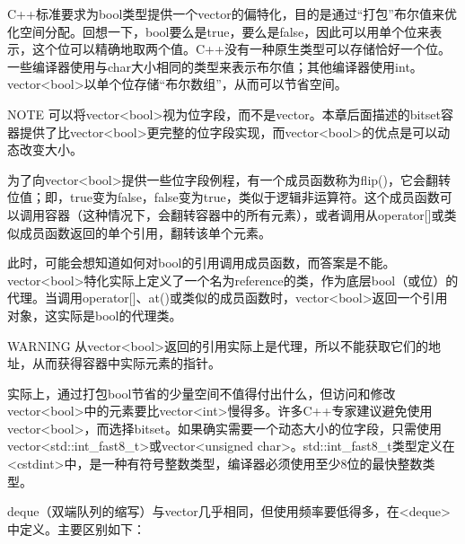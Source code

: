 
C++标准要求为bool类型提供一个vector的偏特化，目的是通过“打包”布尔值来优化空间分配。回想一下，bool要么是true，要么是false，因此可以用单个位来表示，这个位可以精确地取两个值。C++没有一种原生类型可以存储恰好一个位。一些编译器使用与char大小相同的类型来表示布尔值；其他编译器使用int。vector<bool>以单个位存储“布尔数组”，从而可以节省空间。

\begin{myNotic}{NOTE}
可以将vector<bool>视为位字段，而不是vector。本章后面描述的bitset容器提供了比vector<bool>更完整的位字段实现，而vector<bool>的优点是可以动态改变大小。
\end{myNotic}

为了向vector<bool>提供一些位字段例程，有一个成员函数称为flip()，它会翻转位值；即，true变为false，false变为true，类似于逻辑非运算符。这个成员函数可以调用容器（这种情况下，会翻转容器中的所有元素），或者调用从operator[]或类似成员函数返回的单个引用，翻转该单个元素。

此时，可能会想知道如何对bool的引用调用成员函数，而答案是不能。vector<bool>特化实际上定义了一个名为reference的类，作为底层bool（或位）的代理。当调用operator[]、at()或类似的成员函数时，vector<bool>返回一个引用对象，这实际是bool的代理类。

\begin{myWarning}{WARNING}
从vector<bool>返回的引用实际上是代理，所以不能获取它们的地址，从而获得容器中实际元素的指针。
\end{myWarning}

实际上，通过打包bool节省的少量空间不值得付出什么，但访问和修改vector<bool>中的元素要比vector<int>慢得多。许多C++专家建议避免使用vector<bool>，而选择bitset。如果确实需要一个动态大小的位字段，只需使用vector<std::int\_fast8\_t>或vector<unsigned char>。std::int\_fast8\_t类型定义在<cstdint>中，是一种有符号整数类型，编译器必须使用至少8位的最快整数类型。


deque（双端队列的缩写）与vector几乎相同，但使用频率要低得多，在<deque>中定义。主要区别如下：

